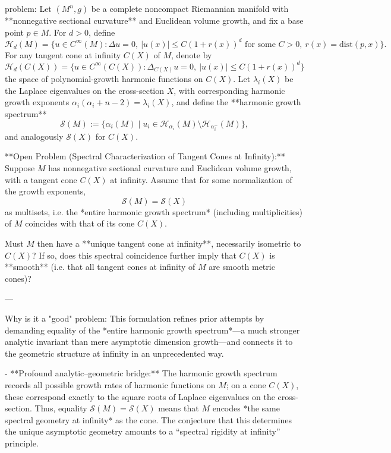 problem:  
Let \( (M^n,g) \) be a complete noncompact Riemannian manifold with **nonnegative sectional curvature** and Euclidean volume growth, and fix a base point \(p \in M\).  
For \(d>0\), define  
\[
\mathcal{H}_d(M)=\{u\in C^\infty(M):\Delta u=0,\ |u(x)|\le C(1+r(x))^d \text{ for some }C>0,\ r(x)=\mathrm{dist}(p,x)\}.
\]
For any tangent cone at infinity \(C(X)\) of \(M\), denote by
\[
\mathcal{H}_d(C(X))=\{u\in C^\infty(C(X)):\Delta_{C(X)}u=0,\ |u(x)|\le C(1+r(x))^d\}
\]
the space of polynomial-growth harmonic functions on \(C(X)\).  
Let \(\lambda_i(X)\) be the Laplace eigenvalues on the cross-section \(X\), with corresponding harmonic growth exponents
\(\alpha_i(\alpha_i+n-2)=\lambda_i(X)\), and define the **harmonic growth spectrum**
\[
\mathcal{S}(M):=\{\alpha_i(M)\mid u_i\in \mathcal{H}_{\alpha_i}(M)\setminus \mathcal{H}_{\alpha_i^-}(M)\},
\]
and analogously \(\mathcal{S}(X)\) for \(C(X)\).

**Open Problem (Spectral Characterization of Tangent Cones at Infinity):**  
Suppose \(M\) has nonnegative sectional curvature and Euclidean volume growth, with a tangent cone \(C(X)\) at infinity.  
Assume that for some normalization of the growth exponents,
\[
\mathcal{S}(M)=\mathcal{S}(X)
\]
as multisets, i.e. the *entire harmonic growth spectrum* (including multiplicities) of \(M\) coincides with that of its cone \(C(X)\).  

Must \(M\) then have a **unique tangent cone at infinity**, necessarily isometric to \(C(X)\)?  
If so, does this spectral coincidence further imply that \(C(X)\) is **smooth** (i.e. that all tangent cones at infinity of \(M\) are smooth metric cones)?

---

Why is it a "good" problem:  
This formulation refines prior attempts by demanding equality of the *entire harmonic growth spectrum*—a much stronger analytic invariant than mere asymptotic dimension growth—and connects it to the geometric structure at infinity in an unprecedented way.

- **Profound analytic–geometric bridge:**  
  The harmonic growth spectrum records all possible growth rates of harmonic functions on \(M\); on a cone \(C(X)\), these correspond exactly to the square roots of Laplace eigenvalues on the cross-section. Thus, equality \(\mathcal{S}(M)=\mathcal{S}(X)\) means that \(M\) encodes *the same spectral geometry at infinity* as the cone. The conjecture that this determines the unique asymptotic geometry amounts to a “spectral rigidity at infinity” principle.

